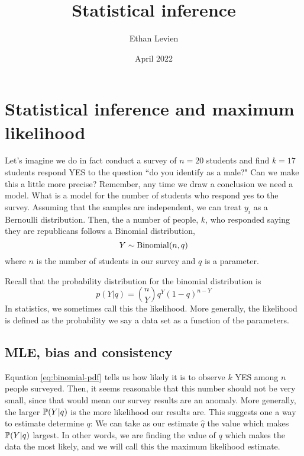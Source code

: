 

\title{\Huge \color{C1}  Statistical inference}
\author{Ethan Levien}
\date{April 2022}



\maketitle

\tableofcontents




\section{Statistical inference and maximum likelihood}
Let's imagine we do in fact conduct a survey of $n = 20$ students and find $k = 17$ students respond YES to the question ``do you identify as a male?"
Can we make this a little more precise? Remember, any time we draw a conclusion we need a model. What is a model for the number of students who respond yes to the survey. Assuming that the samples are independent, we can treat $y_i$ as a Bernoulli distribution. Then, the a number of people, $k$, who responded saying they are republicans follows a Binomial distribution, 
\begin{equation}
Y \sim {\rm Binomial}(n,q)
\end{equation}
where $n$ is the number of students in our survey and $q$ is a parameter. 


Recall that the probability distribution for the binomial distribution is 
\begin{equation}\label{eq:binomial-pdf}
p(Y|q) = {n \choose Y}q^Y(1-q)^{n-Y}
\end{equation}
In statistics, we sometimes call this the {\dfn likelihood}. More generally, the likelihood is defined as the probability we say a data set as a function of the parameters. 

\subsection{MLE, bias and consistency}
Equation \eqref{eq:binomial-pdf} tells us how likely it is to observe $k$ YES among $n$ people surveyed. Then, it seems reasonable that this number should not be very small, since that would mean our survey results are an anomaly. More generally, the larger $\mathbb P(Y|q)$ is the more likelihood our results are. This suggests one a way to estimate determine $q$: We can take as our estimate $\hat{q}$ the value which makes $\mathbb P(Y|q)$ largest. In other words, we are finding the value of $q$ which makes the data the most likely, and we will call this the {\dfn  maximum likelihood estimate}.

